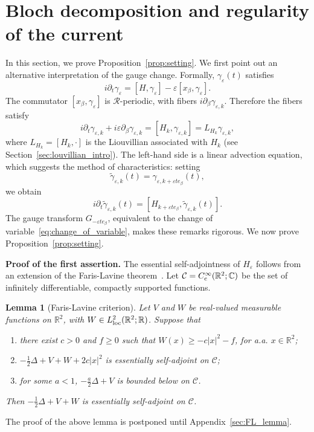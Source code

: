 \documentclass[a4paper,11pt]{article}
\theoremstyle{plain}
\newtheorem{lemma}[theorem]{Lemma}
\theoremstyle{remark}
\def\R{{\mathbb R}}
\def\C{{\mathbb C}}
\def\eps{{\varepsilon}}
\def\cR{{\mathcal R}}
\begin{document}
\section{Bloch decomposition and regularity of the current}\label{sec:preliminaries}
In this section, we prove Proposition~\ref{prop:setting}. We first
point out an alternative interpretation of the gauge change.
Formally, $\gamma_\eps(t)$ satisfies
\[
i\partial_t\gamma_\eps=[H,\gamma_\eps]-\eps[x_\beta,\gamma_\eps].
\]
The commutator $[x_\beta,\gamma_\eps]$ is $\cR$-periodic, with fibers
$i\partial_\beta\gamma_{\eps,k}$. Therefore the fibers satisfy
\[
i\partial_t\gamma_{\eps,k}+i\eps\partial_\beta\gamma_{\eps,k}
=[H_k,\gamma_{\eps,k}]=L_{H_k}\gamma_{\eps,k},
\]
where $L_{H_k}=[H_k,\cdot]$ is the Liouvillian associated with $H_k$
(see Section~\ref{sec:louvillian_intro}). The left-hand side is a linear
advection equation, which suggests the method of characteristics: setting
\begin{equation}\label{eq:change_of_variable}
\widetilde\gamma_{\eps,k}(t)=\gamma_{\eps,k+\eps te_\beta}(t),
\end{equation}
we obtain
\[
i\partial_t\widetilde\gamma_{\eps,k}(t)
=[H_{k+\eps te_\beta},\widetilde\gamma_{\eps,k}(t)].
\]
The gauge transform $G_{-\eps te_\beta}$, equivalent to the change of
variable~\eqref{eq:change_of_variable}, makes these remarks rigorous.
We now prove Proposition~\ref{prop:setting}.


{\bf Proof of the first assertion.}
The essential self-adjointness of $H_\eps$ follows from an extension of the Faris-Lavine theorem~\cite[Theorem~X.38]{ReedSimon2}.  Let $\mathcal{C} = C^\infty_{\rm c}(\R^2;\C)$ be the set of infinitely differentiable, compactly supported functions.
\begin{lemma}[Faris-Lavine criterion]
\label{FarisLavine}
Let $V$ and $W$ be real-valued measurable functions on $\R^2$,
with $W\in L^2_{\rm loc}(\R^2;\R)$. Suppose that
\begin{enumerate}
\item there exist $c>0$ and $f\ge0$ such that
$W(x) \geq - c|x|^2 - f$, for a.a. $x\in \R^2$;
\item
$-\frac12\Delta + V + W +2c|x|^2$ is essentially self-adjoint on $\mathcal{C}$;
\item for some $a<1$, $-\frac a2\Delta + V$ is bounded below on $\mathcal{C}$.
\end{enumerate}
Then $-\frac12\Delta + V + W$ is essentially self-adjoint on $\mathcal{C}$.
\end{lemma}
The proof of the above lemma is postponed until Appendix~\ref{sec:FL_lemma}.
\medskip
\end{document}
